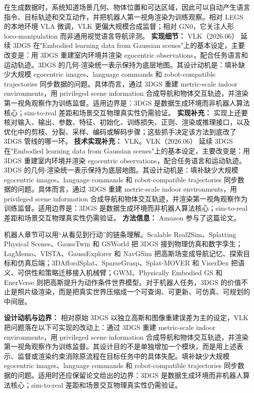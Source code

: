 在生成数据时，系统知道场景几何、物体位置和可达区域，因此可以自动产生语言指令、目标轨迹和交互动作，并把机器人第一视角渲染为训练观察。相对 LEGS 的本地环境 VLA 微调，VLK 更偏大规模合成监督；相对 GN0，它关注人形 loco-manipulation 而非通用视觉语言导航评测。
\textbf{实现细节：} VLK（2026.06） 延续 3DGS 在"Embodied learning data from Gaussian scenes"上的基本设定，主要改变是：用 3DGS 重建室内环境并渲染 egocentric observations，配合任务语言和运动轨迹。3DGS 的几何-渲染统一表示保持为底层地图。其设计动机是：填补缺少大规模 egocentric images、language commands 和 robot-compatible trajectories 同步数据的问题。具体而言，通过 3DGS 重建 metric-scale indoor environments，用 privileged scene information 合成导航和物体交互轨迹，并渲染第一视角观察作为训练监督。适用边界是：3DGS 是数据生成环境而非机器人算法核心；sim-to-real 差距和场景交互物理真实性仍需验证。
\textbf{实现补充：} 实现上还要核对输入、输出、参数、特征、初始化、训练损失、正则、渲染或推理接口，以及优化中的剪枝、分裂、采样、编码或解码步骤；这些抓手决定该方法到底改了 3DGS 管线的哪一环。
\textbf{技术实现补充：} VLK。VLK（2026.06） 延续 3DGS 在"Embodied learning data from Gaussian scenes"上的基本设定，主要改变是：用 3DGS 重建室内环境并渲染 egocentric observations，配合任务语言和运动轨迹。3DGS 的几何-渲染统一表示保持为底层地图。其设计动机是：填补缺少大规模 egocentric images、language commands 和 robot-compatible trajectories 同步数据的问题。具体而言，通过 3DGS 重建 metric-scale indoor environments，用 privileged scene information 合成导航和物体交互轨迹，并渲染第一视角观察作为训练监督。适用边界是：3DGS 是数据生成环境而非机器人算法核心；sim-to-real 差距和场景交互物理真实性仍需验证。
\textbf{方法信息：} Amazon 参与了这篇论文。

\begin{takeaway}
机器人章节可以用“从看见到行动”的链条理解。Scalable Real2Sim、Splatting Physical Scenes、GaussTwin 和 GSWorld 把 3DGS 接到物理仿真和数字孪生；LagMemo、VISTA、GaussExplorer 和 NavGSim 把高斯场变成导航记忆、探索目标和仿真后端；3DAffordSplat、SparseGrasp、Splat-MOVER 和 ViserDex 把语义、可供性和策略迁移接入机械臂；GWM、Physically Embodied GS 和 EnerVerse 则把高斯提升为动作条件世界模型。对于机器人任务，3DGS 的价值不止是照片级渲染，而是把真实世界压缩成一个可查询、可更新、可仿真、可规划的中间层。
\end{takeaway}
\textbf{设计动机与边界：} 相对原始 3DGS 以独立高斯和图像重建误差为主的设定，VLK 把问题落在以下可实现的改动上：通过 3DGS 重建 metric-scale indoor environments，用 privileged scene information 合成导航和物体交互轨迹，并渲染第一视角观察作为训练监督。其设计目的不是单独增加一个模块，而是用上述表示、监督或渲染约束消除原流程在目标任务中的具体失配。填补缺少大规模 egocentric images、language commands 和 robot-compatible trajectories 同步数据的问题。适用时还应保留论文给出的边界：3DGS 是数据生成环境而非机器人算法核心；sim-to-real 差距和场景交互物理真实性仍需验证。
